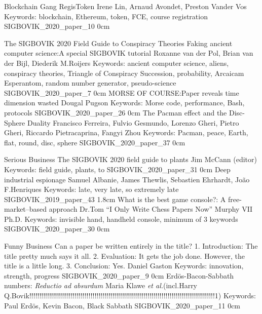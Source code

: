 \addtrack
	{}{Blockchain Gang}
\addpaper
	{RegisToken}
	{Irene Lin, Arnaud Avondet, Preston Vander Vos}
	{Keywords: blockchain, Ethereum, token, FCE, course registration}
	{SIGBOVIK_2020_paper_10}
	{0cm}
	{}

\addtrack
	{}{\LARGE The SIGBOVIK 2020 Field Guide to Conspiracy Theories}
\addpaper
	{Faking ancient computer science:\@ A special SIGBOVIK tutorial}
	{Roxanne van der Pol, Brian van der Bijl, Diederik M.\@ Roijers}
	{Keywords: ancient computer science, aliens, conspiracy theories, Triangle of Conspiracy Succession, probability, Arcaicam Esperantom, random number generator, pseudo-science}
	{SIGBOVIK_2020_paper_7}
	{0cm}
	{}
\addpaper
	{MORSE OF COURSE:\@ Paper reveals time dimension wasted}
	{Dougal Pugson}
	{Keywords: Morse code, performance, Bash, protocols}
	{SIGBOVIK_2020_paper_26}
	{0cm}
	{}
\addpaper
	{The Pacman effect and the Disc-Sphere Duality}
	{Francisco Ferreira, Fulvio Gesmundo, Lorenzo Gheri, Pietro Gheri, Riccardo Pietracaprina, Fangyi Zhou}
	{Keywords: Pacman, peace, Earth, flat, round, disc, sphere}
	{SIGBOVIK_2020_paper_37}
	{0cm}
	{}

\addtrack
	{}{Serious Business}
\addpaper
	{The SIGBOVIK 2020 field guide to plants}
	{Jim McCann (editor)}
	{Keywords: field guide, plants, to}
	{SIGBOVIK_2020_paper_31}
	{0cm}
	{}
\addpaper
	{Deep industrial espionage}
	{Samuel Albanie, James Thewlis, Sebastien Ehrhardt, Jo\~ao F.\@ Henriques}
	{Keywords: late, very late, so extremely late}
	{SIGBOVIK_2019_paper_43}
	{1.8cm}
	{}
\addpaper
	{What is the best game console?: A free-market--based approach}
	{Dr.\@ Tom ``I Only Write Chess Papers Now'' Murphy VII Ph.D.}
	{Keywords: invisible hand, handheld console, minimum of 3 keywords}
	{SIGBOVIK_2020_paper_30}
	{0cm}
	{}

\addtrack
	{}{Funny Business}
\addpaper
	{Can a paper be written entirely in the title? 1. Introduction: The title pretty much says it all. 2. Evaluation: It gets the job done. However, the title is a little long. 3. Conclusion: Yes.}
	{Daniel Gaston}
	{Keywords: innovation, strength, progress}
	{SIGBOVIK_2020_paper_9}
	{0cm}
	{}
\addpaper
	{Erd\"os-Bacon-Sabbath numbers: \textit{Reductio ad absurdum}}
	{Maria Klawe \textit{et al.}\@ (incl.\@ Harry Q.\@ Bovik!!!!!!!!!!!!!!!!!!!!!!!!!!!!!!!!!!!!!!!!!!!!!!!!!!!!!!!!!!!!!!!!!!!!!!!!!!!!!!!!!!!!!!!!!!!!!!1)}
	{Keywords: Paul Erd\"os, Kevin Bacon, Black Sabbath}
	{SIGBOVIK_2020_paper_11}
	{0cm}
	{}
